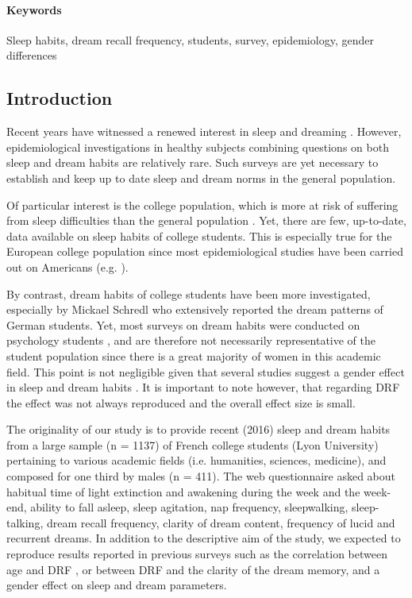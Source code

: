 \paragraph{Keywords}
Sleep habits, dream recall frequency, students, survey, epidemiology, gender differences

\subsection*{Introduction}
\label{res:survey:intro}

Recent years have witnessed a renewed interest in sleep and dreaming \citep{dijk_dreaming_2015}. However, epidemiological investigations in healthy subjects combining questions on both sleep and dream habits are relatively rare. Such surveys are yet necessary to establish and keep up to date sleep and dream norms in the general population.

Of particular interest is the college population, which is more at risk of suffering from sleep difficulties than the general population \citep{buboltz_sleep_2001, curcio_sleep_2006, forquer_sleep_2008, lund_sleep_2010}. Yet, there are few, up-to-date, data available on sleep habits of college students. This is especially true for the European college population since most epidemiological studies have been carried out on Americans (e.g. \citealp{lund_sleep_2010}).

By contrast, dream habits of college students have been more investigated, especially by Mickael Schredl who extensively reported the dream patterns of German students. Yet, most surveys on dream habits were conducted on psychology students \citep{schredl_factors_2003}, and are therefore not necessarily representative of the student population since there is a great majority of women in this academic field. This point is not negligible given that several studies suggest a gender effect in sleep and dream habits \citep{beck_insomnia_2013, schredl_gender_2008}. It is important to note however, that regarding DRF the effect was not always reproduced and the overall effect size is small.

The originality of our study is to provide recent (2016) sleep and dream habits from a large sample (n = 1137) of French college students (Lyon University) pertaining to various academic fields (i.e. humanities, sciences, medicine), and composed for one third by males (n = 411). The web questionnaire asked about habitual time of light extinction and awakening during the week and the week-end, ability to fall asleep, sleep agitation, nap frequency, sleepwalking, sleep-talking, dream recall frequency, clarity of dream content, frequency of lucid and recurrent dreams. In addition to the descriptive aim of the study, we expected to reproduce results reported in previous surveys such as the correlation between age and DRF \citep{schredl_dream_2008}, or between DRF and the clarity of the dream memory, and a gender effect on sleep and dream parameters.

